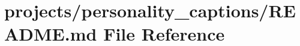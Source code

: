 \hypertarget{projects_2personality__captions_2README_8md}{}\section{projects/personality\+\_\+captions/\+R\+E\+A\+D\+ME.md File Reference}
\label{projects_2personality__captions_2README_8md}

